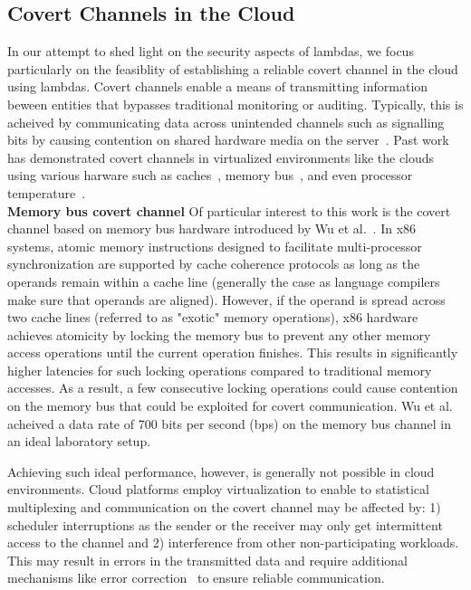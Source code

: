 \subsection{Covert Channels in the Cloud}
\label{sec:background:covertchannels}
In our attempt to shed light on the security aspects of lambdas, we focus
particularly on the feasiblity of establishing a reliable covert channel in the
cloud using lambdas.  Covert channels enable a means of transmitting information
beween entities that bypasses traditional monitoring or auditing. Typically,
this is acheived by communicating data across unintended channels such as
signalling bits by causing contention on shared hardware media on the
server~\cite{L2cacheCovertChannels,
ProcessorCovertChannels,ThermalCovertChannel,SshOverCovertChannel,wuusenix2012}.
Past work has demonstrated covert channels in virtualized environments like the
clouds using various harware such as
caches~\cite{ristenpartccs2009,L2cacheCovertChannels}, memory
bus~\cite{wuusenix2012}, and even processor
temperature~\cite{ThermalCovertChannel}. \\

\noindent \textbf{Memory bus covert channel} 
Of particular interest to this work is the covert channel based on memory bus
hardware introduced by Wu et al.~\cite{wuusenix2012}.  In x86 systems, atomic
memory instructions designed to facilitate multi-processor synchronization are
supported by cache coherence protocols as long as the operands remain within a
cache line (generally the case as language compilers make sure that operands are
aligned). However, if the operand is spread across two cache lines (referred to
as "exotic" memory operations), x86 hardware achieves atomicity by locking the
memory bus to prevent any other memory access operations until the current
operation finishes. This results in significantly higher latencies for such
locking operations compared to traditional memory accesses. As a result, a few
consecutive locking operations could cause contention on the memory bus that
could be exploited for covert communication.  Wu et al. acheived a data rate of
700 bits per second (bps) on the memory bus channel in an ideal laboratory
setup.

Achieving such ideal performance, however, is generally not possible in cloud 
environments. Cloud platforms employ virtualization to enable to statistical 
multiplexing and communication on the covert channel may be affected by:
1) scheduler interruptions as the sender or the receiver may only get intermittent 
access to the channel and 2) interference from other non-participating
workloads. This may result in errors in the transmitted data and require 
additional mechanisms like error correction~\cite{wuusenix2012} to ensure
reliable communication.


